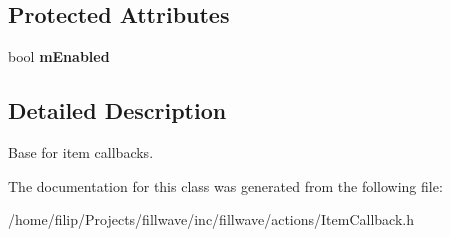 \subsection*{Protected Attributes}
\begin{DoxyCompactItemize}
\item 
\hypertarget{classfillwave_1_1actions_1_1ItemCallback_a5eeb5a6801cf0bfc654610752d85652c}{}bool {\bfseries m\+Enabled}\label{classfillwave_1_1actions_1_1ItemCallback_a5eeb5a6801cf0bfc654610752d85652c}

\end{DoxyCompactItemize}


\subsection{Detailed Description}
Base for item callbacks. 

The documentation for this class was generated from the following file\+:\begin{DoxyCompactItemize}
\item 
/home/filip/\+Projects/fillwave/inc/fillwave/actions/Item\+Callback.\+h\end{DoxyCompactItemize}
